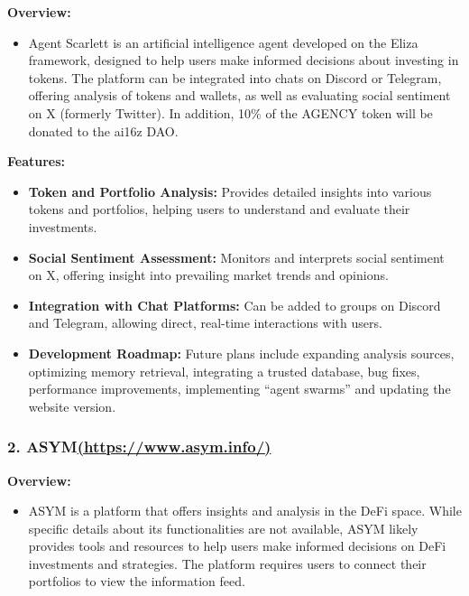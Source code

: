 \documentclass[
]{article}
\providecommand{\tightlist}{%
  \setlength{\itemsep}{0pt}\setlength{\parskip}{0pt}}
\begin{document}
\textbf{Overview:}

\begin{itemize}
\tightlist
\item
  Agent Scarlett is an artificial intelligence agent developed on the
  Eliza framework, designed to help users make informed decisions about
  investing in tokens. The platform can be integrated into chats on
  Discord or Telegram, offering analysis of tokens and wallets, as well
  as evaluating social sentiment on X (formerly Twitter). In addition,
  10\% of the AGENCY token will be donated to the ai16z DAO.
\end{itemize}

\textbf{Features:}

\begin{itemize}
\tightlist
\item
  \textbf{Token and Portfolio Analysis:} Provides detailed insights into
  various tokens and portfolios, helping users to understand and
  evaluate their investments.
\item
  \textbf{Social Sentiment Assessment:} Monitors and interprets social
  sentiment on X, offering insight into prevailing market trends and
  opinions.
\item
  \textbf{Integration with Chat Platforms:} Can be added to groups on
  Discord and Telegram, allowing direct, real-time interactions with
  users.
\item
  \textbf{Development Roadmap:} Future plans include expanding analysis
  sources, optimizing memory retrieval, integrating a trusted database,
  bug fixes, performance improvements, implementing ``agent swarms'' and
  updating the website version.
\end{itemize}

\hypertarget{asymhttpswww.asym.info}{%
\subsubsection{\texorpdfstring{2.
ASYM\href{https://www.asym.info/}{(https://www.asym.info/)}}{2. ASYM(https://www.asym.info/)}}\label{asymhttpswww.asym.info}}

\textbf{Overview:}

\begin{itemize}
\tightlist
\item
  ASYM is a platform that offers insights and analysis in the DeFi
  space. While specific details about its functionalities are not
  available, ASYM likely provides tools and resources to help users make
  informed decisions on DeFi investments and strategies. The platform
  requires users to connect their portfolios to view the information
  feed.
\end{itemize}
\end{document}
